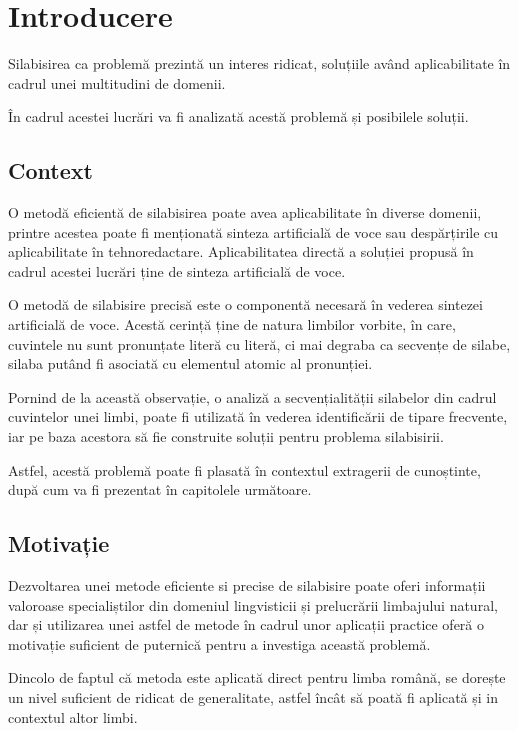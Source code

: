 \chapter{Introducere}
\label{cap:Introducere}

Silabisirea ca problemă prezintă un interes ridicat, soluțiile având aplicabilitate în cadrul unei multitudini de domenii. 

În cadrul acestei lucrări va fi analizată acestă problemă și posibilele soluții.

\section{Context}

O metodă eficientă de silabisirea poate avea aplicabilitate în diverse domenii, printre acestea poate fi menționată sinteza artificială de voce sau despărțirile cu aplicabilitate în tehnoredactare. Aplicabilitatea directă a soluției propusă în cadrul acestei lucrări ține de sinteza artificială de voce.

O metodă de silabisire precisă este o componentă necesară în vederea sintezei artificială de voce. Acestă cerință ține de natura limbilor vorbite, în care, cuvintele nu sunt pronunțate literă cu literă, ci mai degraba ca secvențe de silabe, silaba putând fi asociată cu elementul atomic al pronunției.

Pornind de la această observație, o analiză a secvențialității silabelor din cadrul cuvintelor unei limbi, poate fi utilizată în vederea identificării de tipare frecvente, iar pe baza acestora să fie construite soluții pentru problema silabisirii.  

Astfel, acestă problemă poate fi plasată în contextul extragerii de cunoștinte, după cum va fi prezentat în capitolele următoare.

\section{Motivație}

Dezvoltarea unei metode eficiente si precise de silabisire poate oferi informații valoroase specialiștilor din domeniul lingvisticii și prelucrării limbajului natural, dar și utilizarea unei astfel de metode în cadrul unor aplicații practice oferă o motivație suficient de puternică pentru a investiga această problemă. 

Dincolo de faptul că metoda este aplicată direct pentru limba română, se dorește un nivel suficient de ridicat de generalitate, astfel încât să poată fi aplicată și in contextul altor limbi.

